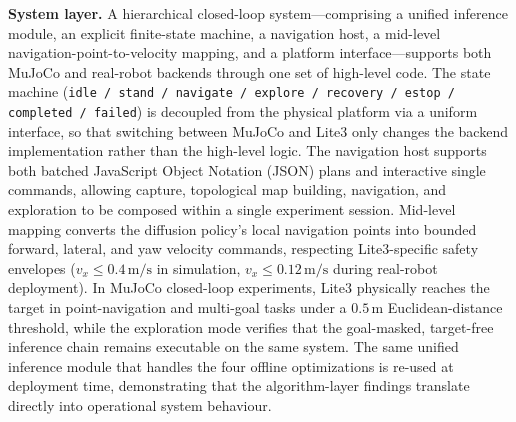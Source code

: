\begin{digest}[en]
\textbf{System layer.} A hierarchical closed-loop system---comprising a unified
inference module, an explicit finite-state machine, a navigation host, a mid-level
navigation-point-to-velocity mapping, and a platform interface---supports both MuJoCo and
real-robot backends through one set of high-level code. The state machine
(\texttt{idle / stand / navigate / explore / recovery / estop / completed / failed})
is decoupled from the physical platform via a uniform interface, so that switching
between MuJoCo and Lite3 only changes the backend implementation rather than the
high-level logic. The navigation host supports both batched JavaScript Object Notation (JSON) plans and interactive
single commands, allowing capture, topological map building, navigation, and exploration to be
composed within a single experiment session. Mid-level mapping converts the diffusion
policy's local navigation points into bounded forward, lateral, and yaw velocity commands,
respecting Lite3-specific safety envelopes ($v_x \le 0.4\,\text{m/s}$ in simulation,
$v_x \le 0.12\,\text{m/s}$ during real-robot deployment). In MuJoCo closed-loop
experiments, Lite3 physically reaches the target in point-navigation and multi-goal
tasks under a $0.5\,\text{m}$ Euclidean-distance threshold, while the exploration mode
verifies that the goal-masked, target-free inference chain remains executable on the
same system. The same unified inference module that handles the four offline optimizations is
re-used at deployment time, demonstrating that the algorithm-layer findings translate
directly into operational system behaviour.


\end{digest}
